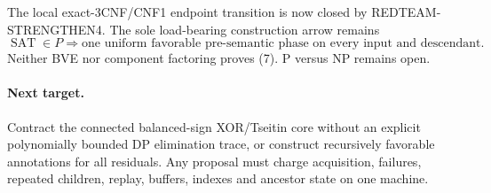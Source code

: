 \documentclass[11pt]{article}
\newcommand{\SAT}{\operatorname{SAT}}
\begin{document}
The local exact-3CNF/CNF1 endpoint transition is now closed by
REDTEAM-STRENGTHEN4.  The sole load-bearing construction arrow remains
\[
 \boxed{\SAT\in P\Longrightarrow
 \text{one uniform favorable pre-semantic phase on every input and descendant}.}
                                                                    \tag{7}
\]
Neither BVE nor component factoring proves (7).  P versus NP remains open.

\paragraph{Next target.}
Contract the connected balanced-sign XOR/Tseitin core without an explicit
polynomially bounded DP elimination trace, or construct recursively favorable
annotations for all residuals.  Any proposal must charge acquisition,
failures, repeated children, replay, buffers, indexes and ancestor state on
one machine.

\end{document}
